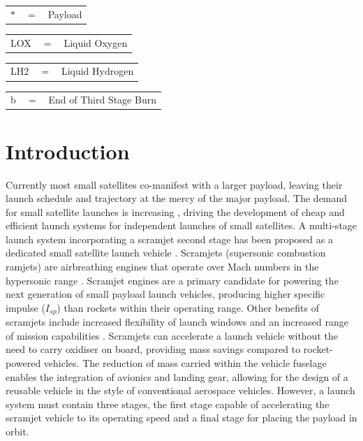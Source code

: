 \documentclass[]{aiaa-tc}
\begin{document}
\begin{tabular}{p{1.2cm}p{1cm}p{5cm}}
	$\ast$ & $=$ & Payload\\
\end{tabular} 
\begin{tabular}{p{1.2cm}p{1cm}p{5cm}}
	LOX & $=$ & Liquid Oxygen\\
\end{tabular} 
\begin{tabular}{p{1.2cm}p{1cm}p{5cm}}
	LH2 & $=$ & Liquid Hydrogen\\
	
\end{tabular} 
\begin{tabular}{p{1.2cm}p{1cm}p{5cm}}
	b & $=$ & End of Third Stage Burn\\
	
\end{tabular} 
\newpage
\section{Introduction}






Currently most small satellites co-manifest with a larger payload, leaving their launch schedule and trajectory at the mercy of the major payload. The  demand for small satellite launches is increasing \cite{Faa&Ast&Comstac2015}, driving the development of cheap and efficient launch systems for independent launches of small satellites. 
A multi-stage launch system incorporating a scramjet second stage has been proposed as a dedicated small satellite launch vehicle \cite{Smart2009a}. 
Scramjets (supersonic combustion ramjets) are airbreathing engines that operate over Mach numbers in the hypersonic  range \cite{HeiserWilliamPratt1994}. 
Scramjet engines are a primary candidate for powering the next generation of small payload launch vehicles, producing higher specific impulse ($I_{sp}$)  than rockets within their operating range. Other benefits of scramjets include increased flexibility of launch windows and an increased range of mission capabilities \cite{Flaherty2010}. 
Scramjets can accelerate a launch vehicle without the need to carry oxidiser on board, providing mass savings compared to rocket-powered vehicles. 
 The reduction of mass carried within the vehicle fuselage enables the integration of avionics and landing gear, allowing for the design of a reusable vehicle in the style of conventional aerospace vehicles. 
However, a launch system must contain three stages, the first stage capable of accelerating the scramjet vehicle to its operating speed and a final stage for placing the payload in orbit. 
\end{document}
